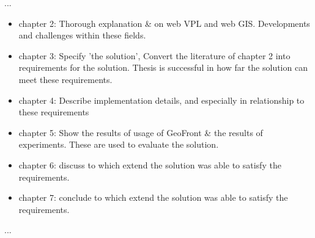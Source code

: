 ...
\begin{itemize}[\m{->}]
  \item chapter 2: Thorough explanation \& on web VPL and web GIS. 
  \subitem Developments and challenges within these fields.
  \item chapter 3: Specify 'the solution', Convert the literature of chapter 2 into requirements for the solution. 
  \subitem Thesis is successful in how far the solution can meet these requirements. 
  \item chapter 4: Describe implementation details, and especially in relationship to these requirements
  \item chapter 5: Show the results of usage of GeoFront \& the results of experiments.
  \subitem These are used to evaluate the solution.
  \item chapter 6: discuss to which extend the solution was able to satisfy the requirements.
  \item chapter 7: conclude to which extend the solution was able to satisfy the requirements.
\end{itemize}

...